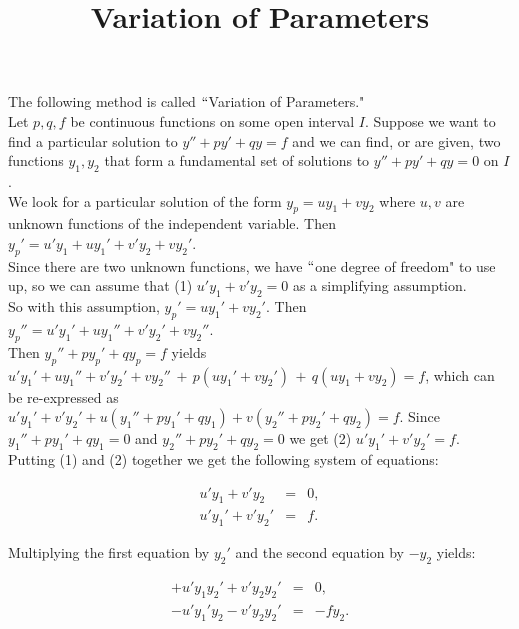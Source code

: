 \documentclass{ximera}
\begin{document}
\begin{abstract}
 \end{abstract}

    \title{Variation of Parameters}
    
    \maketitle

The following method is called $``$Variation of Parameters."\\

Let $p,q,f$ be continuous functions on some open interval $I$.  Suppose we want to find a particular solution to $y''+py'+qy=f$ and we can find, or are given, two functions $y_{1},y_{2}$ that form a fundamental set of solutions to $y''+py'+qy=0$ on $I$.\\

We look for a particular solution of the form $y_p=uy_1+vy_2$ where $u,v$ are unknown functions of the independent variable.  Then $y_p'=u'y_1+uy_1'+v'y_2+vy_2'$. \\

 Since there are two unknown functions, we have $``$one degree of freedom" to use up, so we can assume that (1) $u'y_1+v'y_2=0$ as a simplifying assumption.\\

  So with this assumption, 
  $y_p'=uy_1'+vy_2'$.  Then $y_p''=u'y_1'+uy_1''+v'y_2'+vy_2''$. \\

  Then $y_p''+py_p'+qy_p=f$ yields $u'y_1'+uy_1''+v'y_2'+vy_2''\,+\,p(uy_1'+vy_2')\,+\,q(uy_1+vy_2)=f$, which can be re-expressed as $u'y_1'+v'y_2'+u(y_1''+py_1'+qy_1)+v(y_2''+py_2'+qy_2)=f$.  Since $y_1''+py_1'+qy_1=0$ and $y_2''+py_2'+qy_2=0$ we get (2) $u'y_1'+v'y_2'=f$.\\

  Putting (1) and (2) together we get the following system of equations:

\begin{eqnarray*}
  u'y_1+v'y_2 &=& 0, \\
  u'y_1'+v'y_2' &=& f.
\end{eqnarray*}



Multiplying the first equation by $y_2'$ and the second equation by $-y_2$ yields:

\begin{eqnarray*}
  +u'y_1y_2'+v'y_2y_2' &=& 0, \\
  -u'y_1'y_2-v'y_2y_2' &=& -fy_2.
\end{eqnarray*}
\end{document}
